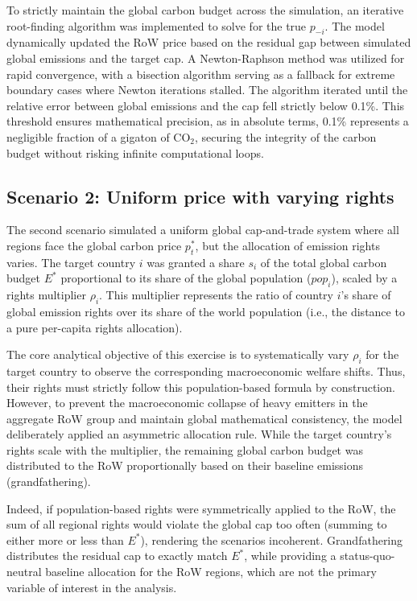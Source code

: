 \documentclass[12pt,english]{article}
\begin{document}
To strictly maintain the global carbon budget across the simulation, an iterative root-finding algorithm was implemented to solve for the true $p_{-i}$. The model dynamically updated the RoW price based on the residual gap between simulated global emissions and the target cap. A Newton-Raphson method was utilized for rapid convergence, with a bisection algorithm serving as a fallback for extreme boundary cases where Newton iterations stalled. The algorithm iterated until the relative error between global emissions and the cap fell strictly below 0.1\%. This threshold ensures mathematical precision, as in absolute terms, 0.1\% represents a negligible fraction of a gigaton of CO$_2$, securing the integrity of the carbon budget without risking infinite computational loops.

\subsection{Scenario 2: Uniform price with varying rights}

The second scenario simulated a uniform global cap-and-trade system where all regions face the global carbon price $p_t^*$, but the allocation of emission rights varies. The target country $i$ was granted a share $s_i$ of the total global carbon budget $E^*$ proportional to its share of the global population ($pop_i$), scaled by a rights multiplier $\rho_i$. This multiplier represents the ratio of country $i$'s share of global emission rights over its share of the world population (i.e., the distance to a pure per-capita rights allocation).

The core analytical objective of this exercise is to systematically vary $\rho_i$ for the target country to observe the corresponding macroeconomic welfare shifts. Thus, their rights must strictly follow this population-based formula by construction. However, to prevent the macroeconomic collapse of heavy emitters in the aggregate RoW group and maintain global mathematical consistency, the model deliberately applied an asymmetric allocation rule. While the target country’s rights scale with the multiplier, the remaining global carbon budget was distributed to the RoW proportionally based on their baseline emissions (grandfathering). 

Indeed, if population-based rights were symmetrically applied to the RoW, the sum of all regional rights would violate the global cap too often (summing to either more or less than $E^*$), rendering the scenarios incoherent. Grandfathering distributes the residual cap to exactly match $E^*$, while providing a status-quo-neutral baseline allocation for the RoW regions, which are not the primary variable of interest in the analysis.
\end{document}
